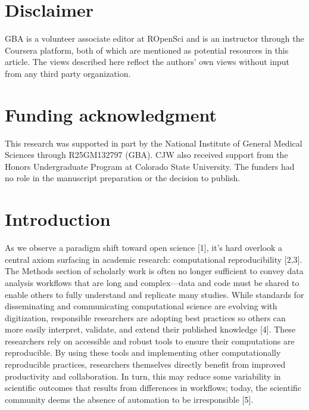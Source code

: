 \documentclass[10pt,letterpaper]{article}
\begin{document}

\linenumbers

\hypertarget{disclaimer}{%
\section{Disclaimer}\label{disclaimer}}

GBA is a volunteer associate editor at ROpenSci and is an instructor
through the Coursera platform, both of which are mentioned as potential
resources in this article. The views described here reflect the authors'
own views without input from any third party organization.

\hypertarget{funding-acknowledgment}{%
\section{Funding acknowledgment}\label{funding-acknowledgment}}

This research was supported in part by the National Institute of General
Medical Sciences through R25GM132797 (GBA). CJW also received support
from the Honors Undergraduate Program at Colorado State University. The
funders had no role in the manuscript preparation or the decision to
publish.

\hypertarget{introduction}{%
\section{Introduction}\label{introduction}}

As we observe a paradigm shift toward open science {[}1{]}, it's hard
overlook a central axiom surfacing in academic research: computational
reproducibility {[}2,3{]}. The Methods section of scholarly work is
often no longer sufficient to convey data analysis workflows that are
long and complex---data and code must be shared to enable others to
fully understand and replicate many studies. While standards for
disseminating and communicating computational science are evolving with
digitization, responsible researchers are adopting best practices so
others can more easily interpret, validate, and extend their published
knowledge {[}4{]}. These researchers rely on accessible and robust tools
to ensure their computations are reproducible. By using these tools and
implementing other computationally reproducible practices, researchers
themselves directly benefit from improved productivity and
collaboration. In turn, this may reduce some variability in scientific
outcomes that results from differences in workflows; today, the
scientific community deems the absence of automation to be irresponsible
{[}5{]}.
\end{document}
